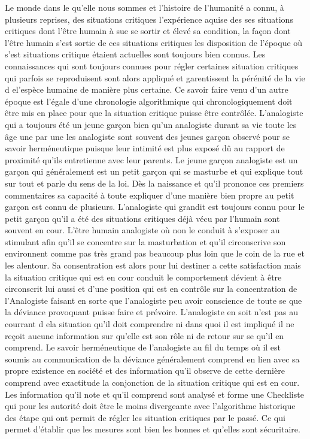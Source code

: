 \documentclass[12pt,letterpaper,oneside]{article}
\begin{document}
Le monde dans le qu'elle nous sommes et l'histoire de l’humanité a connu, à plusieurs reprises, des situations critiques l'expérience aquise des ses situations critiques dont l'être humain à sue se sortir et élevé sa condition, la façon dont l'être humain s'est sortie de ces situations critiques les disposition de l'époque où s'est situations critique étaient actuelles sont toujours bien connus. Les connaissances qui sont toujours connues pour régler certaines situation critiques qui parfois se reproduisent sont alors appliqué et garentissent la pérénité de la vie d el'espèce humaine de manière plus certaine. Ce savoir faire venu d'un autre époque est l'égale d'une chronologie algorithmique qui chronologiquement doit être mis en place pour que la situation critique puisse être contrôlée. L'analogiste qui a toujours été un jeune garçon bien qu'un analogiste durant sa vie toute les âge une par une les analogiste sont souvent des jeunes garçon observé pour se savoir herméneutique puisque leur intimité est plus exposé dû au rapport de proximité qu'ils entretienne avec leur parents. Le jeune garçon analogiste est un garçon qui généralement est un petit garçon qui se masturbe et qui explique tout sur tout et parle du sens de la loi. Dès la naissance et qu'il prononce ces premiers commentaires sa capacité à toute expliquer d'une manière bien propre au petit garçon est connu de plusieurs. L'analogiste qui grandit est toujours connu pour le petit garçon qu'il a été des situations critiques déjà vécu par l'humain sont souvent en cour. L'être humain analogiste où non le conduit à s'exposer au stimulant afin qu'il se concentre sur la masturbation et qu'il circonscrive son environnent comme pas très grand pas beaucoup plus loin que le coin de la rue et les alentour. Sa consentration est alors pour lui destiner a cette satisfaction mais la situation critique qui est en cour conduit le comportement dévient à être circonscrit lui aussi et d'une position qui est en contrôle sur la concentration de l'Analogiste faisant en sorte que l'analogiste peu avoir conscience de toute se que la déviance provoquant puisse faire et prévoire. L'analogiste en soit n'est pas au courrant d ela situation qu'il doit comprendre ni dans quoi il est impliqué il ne reçoit aucune information sur qu'elle est son rôle ni de retour sur se qu'il en comprend. Le savoir herméneutique de l'analogiste au fil du temps où il est soumis au communication de la déviance généralement comprend en lien avec sa propre existence 
en société et des information qu'il observe de cette dernière comprend avec exactitude la conjonction de la situation critique qui est en cour. Les information qu'il note et qu'il comprend sont analysé et forme une Checkliste qui pour les autorité doit être le moins divergeante avec l'algorithme historique des étape qui ont permit de régler les situation critiques par le passé. Ce qui permet d'établir que les mesures sont bien les bonnes et qu'elles sont sécuritaire.
\end{document}
